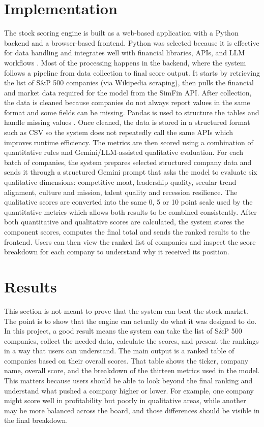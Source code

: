\documentclass[12pt]{article}
\begin{document}
\section{Implementation}
The stock scoring engine is built as a web-based application with a Python backend and a browser-based frontend. Python was selected because it is effective for data handling and integrates well with financial libraries, APIs, and LLM workflows \cite{McKinney2010Pandas}. Most of the processing happens in the backend, where the system follows a pipeline from data collection to final score output. It starts by retrieving the list of S\&P 500 companies (via Wikipedia scraping), then pulls the financial and market data required for the model from the SimFin API. After collection, the data is cleaned because companies do not always report values in the same format and some fields can be missing. Pandas is used to structure the tables and handle missing values \cite{McKinney2010Pandas}. Once cleaned, the data is stored in a structured format such as CSV so the system does not repeatedly call the same APIs which improves runtime efficiency. The metrics are then scored using a combination of quantitative rules and Gemini/LLM-assisted qualitative evaluation. For each batch of companies, the system prepares selected structured company data and sends it through a structured Gemini prompt that asks the model to evaluate six qualitative dimensions: competitive moat, leadership quality, secular trend alignment, culture and mission, talent quality and recession resilience. The qualitative scores are converted into the same 0, 5 or 10 point scale used by the quantitative metrics which allows both results to be combined consistently.
After both quantitative and qualitative scores are calculated, the system stores the component scores, computes the final total and sends the ranked results to the frontend. Users can then view the ranked list of companies and inspect the score breakdown for each company to understand why it received its position.

\section{Results}
This section is not meant to prove that the system can beat the stock market. The point
is to show that the engine can actually do what it was designed to do. In this project, a
good result means the system can take the list of S\&P 500 companies, collect the needed
data, calculate the scores, and present the rankings in a way that users can understand. The
main output is a ranked table of companies based on their overall scores. That table shows
the ticker, company name, overall score, and the breakdown of the thirteen metrics used in
the model. This matters because users should be able to look beyond the final ranking and
understand what pushed a company higher or lower. For example, one company might score
well in profitability but poorly in qualitative areas, while another may be more balanced
across the board, and those differences should be visible in the final breakdown.
\end{document}
